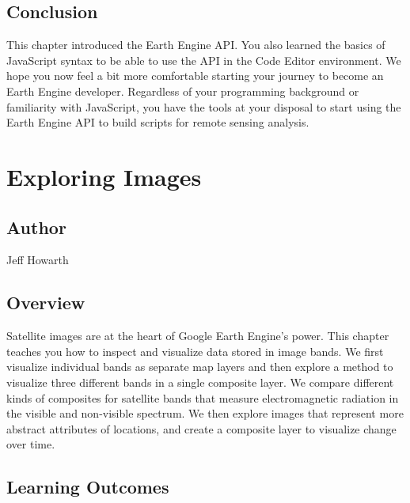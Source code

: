 \documentclass[
  letterpaper,
  DIV=11,
  numbers=noendperiod]{scrreprt}
\begin{document}
\hypertarget{conclusion}{%
\section*{Conclusion}\label{conclusion}}


This chapter introduced the Earth Engine API. You also learned the
basics of JavaScript syntax to be able to use the API in the Code Editor
environment. We hope you now feel a bit more comfortable starting your
journey to become an Earth Engine developer. Regardless of your
programming background or familiarity with JavaScript, you have the
tools at your disposal to start using the Earth Engine API to build
scripts for remote sensing analysis.

\hypertarget{exploring-images}{%
\chapter{Exploring Images}\label{exploring-images}}

\hypertarget{author-1}{%
\section*{Author}\label{author-1}}


Jeff Howarth

\hypertarget{overview-1}{%
\section*{Overview}\label{overview-1}}


Satellite images are at the heart of Google Earth Engine's power. This
chapter teaches you how to inspect and visualize data stored in image
bands. We first visualize individual bands as separate map layers and
then explore a method to visualize three different bands in a single
composite layer. We compare different kinds of composites for satellite
bands that measure electromagnetic radiation in the visible and
non-visible spectrum. We then explore images that represent more
abstract attributes of locations, and create a composite layer to
visualize change over time. ~

\hypertarget{learning-outcomes-1}{%
\section*{Learning Outcomes}\label{learning-outcomes-1}}
\end{document}
